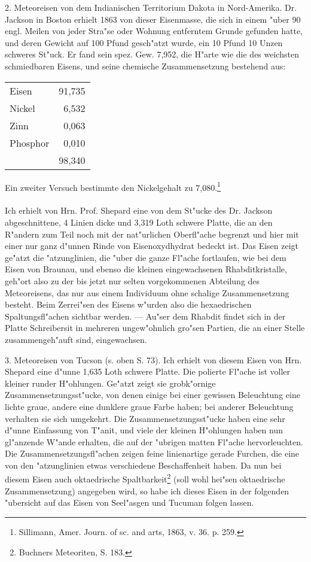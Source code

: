 \documentclass[a4paper, 11pt, oneside]{article}
\begin{document}
2. Meteoreisen von dem Indianischen Territorium Dakota in Nord-Amerika. Dr. Jackson in Boston erhielt 1863 von dieser Eisenmasse, die sich in einem "uber 90 engl. Meilen von jeder Stra"se oder Wohnung entferntem Grunde gefunden hatte, und deren Gewicht auf 100 Pfund gesch"atzt wurde, ein 10 Pfund 10 Unzen schweres St"uck. Er fand sein spez. Gew. 7,952, die H"arte wie die des weichsten schmiedbaren Eisens, und seine chemische Zusammensetzung bestehend aus:
\begin{center}
\begin{tabular}{ l r }
    Eisen & 91,735\\
    Nickel & 6,532\\
    Zinn & 0,063\\
    Phosphor & 0,010\\
     & 98,340\\
\end{tabular}
\end{center}
Ein zweiter Versuch bestimmte den Nickelgehalt zu 7,080.\footnote{Sillimann, Amer. Journ. of sc. and arts, 1863, v. 36. p. 259.}
\paragraph{}
Ich erhielt von Hrn. Prof. Shepard eine von dem St"ucke des Dr. Jackson abgeschnittene, 4 Linien dicke und 3,319 Loth schwere Platte, die an den R"andern zum Teil noch mit der nat"urlichen Oberfl"ache begrenzt und hier mit einer nur ganz d"unnen Rinde von Eisenoxydhydrat bedeckt ist. Das Eisen zeigt ge"atzt die "atzunglinien, die "uber die ganze Fl"ache fortlaufen, wie bei dem Eisen von Braunau, und ebenso die kleinen eingewachsenen Rhabditkristalle, geh"ort also zu der bis jetzt nur selten vorgekommenen Abteilung des Meteoreisens, das nur aus einem Individuum ohne schalige Zusammensetzung besteht. Beim Zerrei"sen des Eisens w"urden also die hexaedrischen Spaltungsfl"achen sichtbar werden. --- Au"ser dem Rhabdit findet sich in der Platte Schreibersit in mehreren ungew"ohnlich gro"sen Partien, die an einer Stelle zusammengeh"auft sind, eingewachsen.

3. Meteoreisen von Tucson (s. oben S. 73). Ich erhielt von diesem Eisen von Hrn. Shepard eine d"unne 1,635 Loth schwere Platte. Die polierte Fl"ache ist voller kleiner runder H"ohlungen. Ge"atzt zeigt sie grobk"ornige Zusammensetzungsst"ucke, von denen einige bei einer gewissen Beleuchtung eine lichte graue, andere eine dunklere graue Farbe haben; bei anderer Beleuchtung verhalten sie sich umgekehrt. Die Zusammensetzungsst"ucke haben eine sehr d"unne Einfassung von T"anit, und viele der kleinen H"ohlungen haben nun gl"anzende W"ande erhalten, die auf der "ubrigen matten Fl"ache hervorleuchten. Die Zusammensetzungsfl"achen zeigen feine linienartige gerade Furchen, die eine von den "atzunglinien etwas verschiedene Beschaffenheit haben. Da nun bei diesem Eisen auch oktaedrische Spaltbarkeit\footnote{Buchners Meteoriten, S. 183.} (soll wohl hei"sen oktaedrische Zusammensetzung) angegeben wird, so habe ich dieses Eisen in der folgenden "ubersicht auf das Eisen von Seel"asgen und Tucuman folgen lassen.
\end{document}
